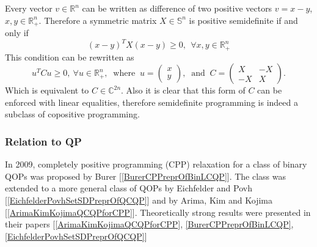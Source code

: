 \documentclass[12pt]{book}
\theoremstyle{definition}
\begin{document}
Every vector $v\in \mathbb{R}^n$ can be written as difference of two positive vectors 
$v = x-y$, $x,y\in\mathbb{R}^n_+$. Therefore a symmetric matrix $X\in\mathbb{S}^n$ is positive semidefinite if and only if 
$$(x-y)^TX(x-y)  \geq 0, \ \ \forall x,y\in\mathbb{R}^n_+$$
This condition can be rewritten as 
$$u^TCu \geq 0, \ \forall u\in\mathbb{R}^n_+, \ \mbox{ where } \ 
u = \left(\begin{array}{c} x \\ y \end{array}\right), \ \mbox{ and } \
C = \left(\begin{array}{rr} X & -X \\ -X & X \end{array}\right).
$$
Which is equivalent to $C\in\mathbb{C}^{2n}$. Also it is clear that this form of $C$ can be enforced with linear equalities, therefore semidefinite programming is indeed a subclass of copositive programming.

\subsubsection{Relation to QP}

In 	2009, completely positive programming (CPP) relaxation for a class of binary QOPs was proposed
by Burer [\ref{BurerCPPreprOfBinLCQP}]. 
The class was extended to a more general class of QOPs by Eichfelder and
Povh [\ref{EichfelderPovhSetSDPreprOfQCQP}] and by Arima, Kim and Kojima [\ref{ArimaKimKojimaQCQPforCPP}]. Theoretically strong results were presented in
their papers [\ref{ArimaKimKojimaQCQPforCPP}, \ref{BurerCPPreprOfBinLCQP}, \ref{EichfelderPovhSetSDPreprOfQCQP}]
\end{document}
